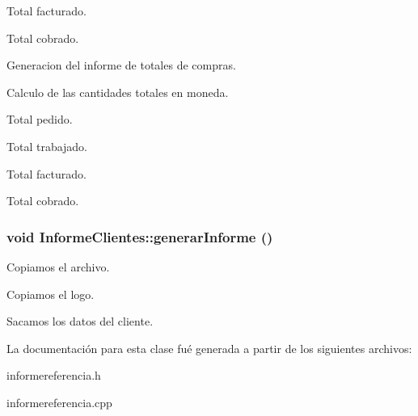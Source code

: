 Total facturado.

Total cobrado.

Generacion del informe de totales de compras.

Calculo de las cantidades totales en moneda.

Total pedido.

Total trabajado.

Total facturado.

Total cobrado. 
\subsubsection{\setlength{\rightskip}{0pt plus 5cm}void Informe\-Clientes::generar\-Informe ()}\label{classInformeClientes_a1}


Copiamos el archivo.

Copiamos el logo.

Sacamos los datos del cliente. 

La documentaci\'{o}n para esta clase fu\'{e} generada a partir de los siguientes archivos:\begin{CompactItemize}
\item 
informereferencia.h\item 
informereferencia.cpp\end{CompactItemize}
